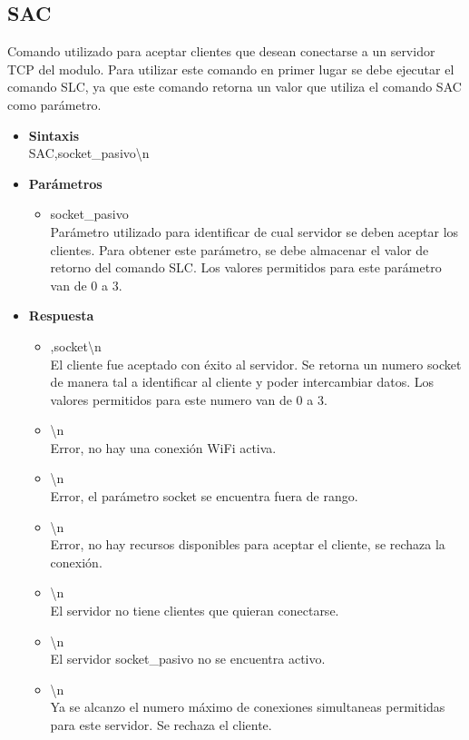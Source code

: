 \documentclass[a4paper,spanish]{article}
\begin{document}
\subsection{SAC}
Comando utilizado para aceptar clientes que desean conectarse a un servidor TCP del modulo. Para utilizar este comando en primer lugar se debe ejecutar el comando SLC, ya que este comando retorna un valor que utiliza el comando SAC como parámetro.
\begin{itemize}
	\item \textbf{Sintaxis}\\
	{\ttfamily SAC,socket\_pasivo\textbackslash n}
	\item \textbf{Parámetros}
	\begin{itemize}
		\item{\ttfamily socket\_pasivo}\\
		Parámetro utilizado para identificar de cual servidor se deben aceptar los clientes. Para obtener este parámetro, se debe almacenar el valor de retorno del comando SLC. Los valores permitidos para este parámetro van de 0 a 3.
	\end{itemize}
	\item \textbf{Respuesta}
	\begin{itemize}
		\item{,socket\textbackslash n} \\
		El cliente fue aceptado con éxito al servidor. Se retorna un numero {\ttfamily socket} de manera tal a identificar al cliente y poder intercambiar datos. Los valores permitidos para este numero van de 0 a 3.
		\item{\textbackslash n} \\
		Error, no hay una conexión WiFi activa.
		\item{\textbackslash n} \\
		Error, el parámetro {\ttfamily socket} se encuentra fuera de rango.
		\item{\textbackslash n} \\
		Error, no hay recursos disponibles para aceptar el cliente, se rechaza la conexión.
		\item{\textbackslash n} \\
		El servidor no tiene clientes que quieran conectarse. 
		\item{\textbackslash n} \\
		El servidor {\ttfamily socket\_pasivo} no se encuentra activo.
		\item{\textbackslash n} \\
		Ya se alcanzo el numero máximo de conexiones simultaneas permitidas para este servidor. Se rechaza el cliente.
	\end{itemize}
\end{itemize}
\end{document}
